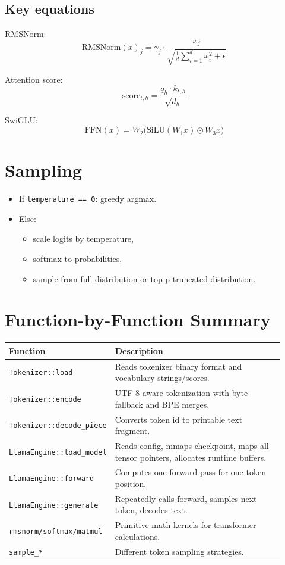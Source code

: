 \documentclass[11pt]{article}
\begin{document}
\subsection{Key equations}
RMSNorm:
\[
\mathrm{RMSNorm}(x)_j = \gamma_j \cdot \frac{x_j}{\sqrt{\frac{1}{d}\sum_{i=1}^{d}x_i^2 + \epsilon}}
\]

Attention score:
\[
\mathrm{score}_{t,h} = \frac{q_h \cdot k_{t,h}}{\sqrt{d_h}}
\]

SwiGLU:
\[
\mathrm{FFN}(x) = W_2\big(\mathrm{SiLU}(W_1x) \odot W_3x\big)
\]

\section{Sampling}
\begin{itemize}[leftmargin=*]
  \item If \texttt{temperature == 0}: greedy argmax.
  \item Else:
  \begin{itemize}
    \item scale logits by temperature,
    \item softmax to probabilities,
    \item sample from full distribution or top-p truncated distribution.
  \end{itemize}
\end{itemize}

\section{Function-by-Function Summary}
\begin{longtable}{p{0.28\linewidth} p{0.64\linewidth}}
\toprule
\textbf{Function} & \textbf{Description} \\
\midrule
\endhead
\texttt{Tokenizer::load} & Reads tokenizer binary format and vocabulary strings/scores. \\
\texttt{Tokenizer::encode} & UTF-8 aware tokenization with byte fallback and BPE merges. \\
\texttt{Tokenizer::decode\_piece} & Converts token id to printable text fragment. \\
\texttt{LlamaEngine::load\_model} & Reads config, mmaps checkpoint, maps all tensor pointers, allocates runtime buffers. \\
\texttt{LlamaEngine::forward} & Computes one forward pass for one token position. \\
\texttt{LlamaEngine::generate} & Repeatedly calls forward, samples next token, decodes text. \\
\texttt{rmsnorm/softmax/matmul} & Primitive math kernels for transformer calculations. \\
\texttt{sample\_*} & Different token sampling strategies. \\
\bottomrule
\end{longtable}
\end{document}
